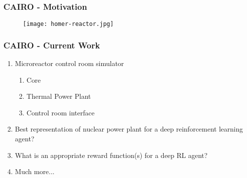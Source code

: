 	\begin{frame}
		\frametitle{CAIRO - Motivation}
		\begin{figure}
			\texttt{[image: homer-reactor.jpg]}
		\end{figure}
	\end{frame}
	\begin{frame}
		\frametitle{CAIRO - Current Work}
		\begin{enumerate}
			\item Microreactor control room simulator
			\begin{enumerate}
				\item Core
				\item Thermal Power Plant
				\item Control room interface
			\end{enumerate}
			\item Best representation of nuclear power plant for a deep reinforcement learning agent?
			\item What is an appropriate reward function(s) for a deep RL agent?
			\item Much more... 
		\end{enumerate}
	\end{frame}



% 
